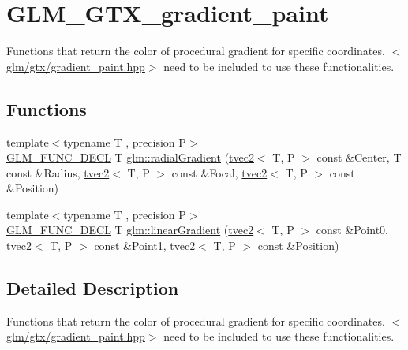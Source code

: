 \hypertarget{group__gtx__gradient__paint}{}\section{G\+L\+M\+\_\+\+G\+T\+X\+\_\+gradient\+\_\+paint}
\label{group__gtx__gradient__paint}


Functions that return the color of procedural gradient for specific coordinates. $<$\mbox{\hyperlink{gradient__paint_8hpp}{glm/gtx/gradient\+\_\+paint.\+hpp}}$>$ need to be included to use these functionalities.  


\subsection*{Functions}
\begin{DoxyCompactItemize}
\item 
{\footnotesize template$<$typename T , precision P$>$ }\\\mbox{\hyperlink{setup_8hpp_ab2d052de21a70539923e9bcbf6e83a51}{G\+L\+M\+\_\+\+F\+U\+N\+C\+\_\+\+D\+E\+CL}} T \mbox{\hyperlink{group__gtx__gradient__paint_ga166d43d567a4cf150579a92f69b0dc9f}{glm\+::radial\+Gradient}} (\mbox{\hyperlink{structglm_1_1tvec2}{tvec2}}$<$ T, P $>$ const \&Center, T const \&Radius, \mbox{\hyperlink{structglm_1_1tvec2}{tvec2}}$<$ T, P $>$ const \&Focal, \mbox{\hyperlink{structglm_1_1tvec2}{tvec2}}$<$ T, P $>$ const \&Position)
\item 
{\footnotesize template$<$typename T , precision P$>$ }\\\mbox{\hyperlink{setup_8hpp_ab2d052de21a70539923e9bcbf6e83a51}{G\+L\+M\+\_\+\+F\+U\+N\+C\+\_\+\+D\+E\+CL}} T \mbox{\hyperlink{group__gtx__gradient__paint_gacde26d5e0c4a1856467bded9dfad9040}{glm\+::linear\+Gradient}} (\mbox{\hyperlink{structglm_1_1tvec2}{tvec2}}$<$ T, P $>$ const \&Point0, \mbox{\hyperlink{structglm_1_1tvec2}{tvec2}}$<$ T, P $>$ const \&Point1, \mbox{\hyperlink{structglm_1_1tvec2}{tvec2}}$<$ T, P $>$ const \&Position)
\end{DoxyCompactItemize}


\subsection{Detailed Description}
Functions that return the color of procedural gradient for specific coordinates. $<$\mbox{\hyperlink{gradient__paint_8hpp}{glm/gtx/gradient\+\_\+paint.\+hpp}}$>$ need to be included to use these functionalities. 



